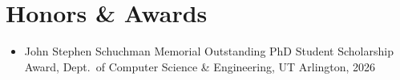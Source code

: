 \section{Honors \& Awards}
\begin{itemize}
  \item John Stephen Schuchman Memorial Outstanding PhD Student Scholarship Award,
        Dept.\ of Computer Science \& Engineering, UT Arlington, 2026
\end{itemize}
